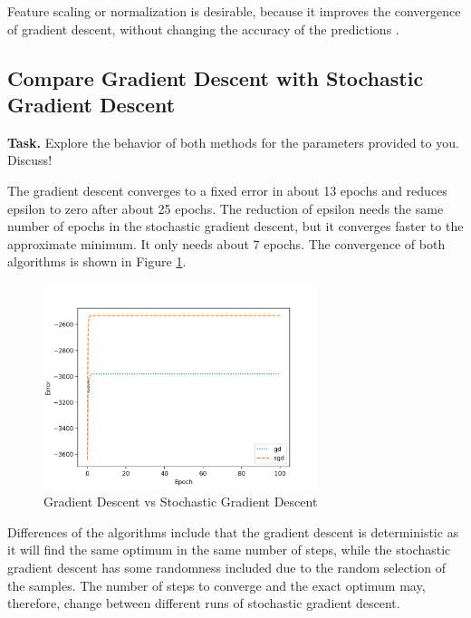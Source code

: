 \documentclass{support/acm_proc_article-sp}
\begin{document}
    Feature scaling or normalization is desirable, because it improves the convergence of gradient descent, without changing
    the accuracy of the predictions \cite{DBLP:journals/corr/IoffeS15}.



    \subsection{Compare Gradient Descent with Stochastic Gradient Descent}
    \vspace{\baselineskip}

    \textbf{Task.} Explore the behavior of both methods for the parameters provided to you.
    Discuss!

    The gradient descent converges to a fixed error in about 13 epochs and reduces epsilon to zero after about
    25 epochs.
    The reduction of epsilon needs the same number of epochs in the stochastic gradient descent, but it converges
    faster to the approximate minimum.
    It only needs about 7 epochs.
    The convergence of both algorithms is shown in Figure \ref{fig:gd-vs-sgd}.

    \begin{figure}[!htbp]
        \centering
        \includegraphics[width=8cm]{images/gd-vs-sgd.png}
        \caption{Gradient Descent vs Stochastic Gradient Descent}
        \label{fig:gd-vs-sgd}
    \end{figure}

    Differences of the algorithms include that the gradient descent is deterministic as it will find the same optimum in
    the same number of steps, while the stochastic gradient descent has some randomness included due to the random
    selection of the samples.
    The number of steps to converge and the exact optimum may, therefore, change between different runs of stochastic gradient
    descent.
\end{document}

